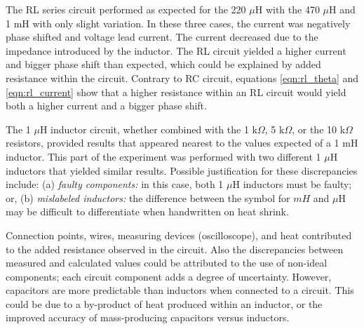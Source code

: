\documentclass[12pt]{article}
\begin{document}
The RL series circuit performed as expected for the 220 $\mu$H with the 470 $\mu$H and 1 mH with only slight variation. In these three cases, the current was negatively phase shifted and voltage lead current. The current decreased due to the impedance introduced by the inductor. The RL circuit yielded a higher current and bigger phase shift than expected, which could be explained by added resistance within the circuit. Contrary to RC circuit, equations \eqref{eqn:rl_theta} and \eqref{eqn:rl_current} show that a higher resistance within an RL circuit would yield both a higher current and a bigger phase shift. 

The 1 $\mu$H inductor circuit, whether combined with the 1 k$\Omega$, 5 k$\Omega$, or the 10 k$\Omega$ resistors, provided results that appeared nearest to the values expected of a 1 mH inductor. This part of the experiment was performed with two different 1 $\mu$H inductors that yielded similar results. Possible justification for these discrepancies include: (a)\textit{ faulty components:} in this case, both 1 $\mu$H inductors must be faulty; or, (b)\textit{ mislabeled inductors:} the difference between the symbol for $mH$ and $\mu$H may be difficult to differentiate when handwritten on heat shrink.

Connection points, wires, measuring devices (oscilloscope), and heat contributed to the added resistance observed in the circuit. Also the discrepancies between measured and calculated values could be attributed to the use of non-ideal components; each circuit component adds a degree of uncertainty. However, capacitors are more predictable than inductors when connected to a circuit. This could be due to a by-product of heat produced within an inductor, or the improved accuracy of mass-producing capacitors versus inductors.

\end{document}
